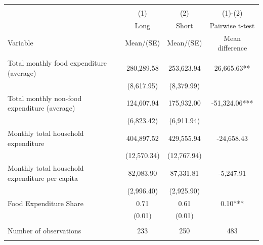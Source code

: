 
\begin{tabular}{@{\extracolsep{5pt}}lccc}
\\[-1.8ex]\hline \hline \\[-1.8ex]
 & \multicolumn{1}{c}{(1)}  & \multicolumn{1}{c}{(2)}  & \multicolumn{1}{c}{(1)-(2)} \\
 & \multicolumn{1}{c}{Long}  & \multicolumn{1}{c}{Short}  & \multicolumn{1}{c}{Pairwise t-test}  \\
Variable & Mean/(SE) & Mean/(SE) & Mean difference \\ \hline \\[-1.8ex] 
Total monthly food expenditure (average)   & 280,289.58    & 253,623.94    & 26,665.63**   \\
 & (8,617.95)  & (8,379.99)  &  \\ [1ex]
Total monthly non-food expenditure (average)   & 124,607.94    & 175,932.00    & -51,324.06***   \\
 & (6,823.42)  & (6,911.94)  &  \\ [1ex]
Monthly total household expenditure   & 404,897.52    & 429,555.94    & -24,658.43   \\
 & (12,570.34)  & (12,767.94)  &  \\ [1ex]
Monthly total household expenditure per capita   & 82,083.90    & 87,331.81    & -5,247.91   \\
 & (2,996.40)  & (2,925.90)  &  \\ [1ex]
Food Expenditure Share   & 0.71    & 0.61    & 0.10***   \\
 & (0.01)  & (0.01)  &  \\ [1ex]
\hline \\[-1.8ex]
Number of observations  & 233   & 250  & 483  \\
\hline \hline \\[-1.8ex]

\end{tabular}
